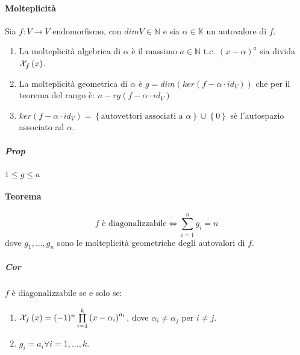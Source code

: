 \documentclass[a4paper,10pt]{article}
\begin{document}
\paragraph{Molteplicità} Sia $f: V \rightarrow V$ endomorfismo, con $dim V \in
\mathbb{N}$ e sia $\alpha \in \mathbb{K}$ un autovalore di $f$.
\begin{enumerate}
    \item La molteplicità algebrica di $\alpha$ è il massimo $a \in \mathbb{N}$
      t.c. $\left(x - \alpha\right)^a$ sia divida ${\cal X}_f\left(x\right)$.
    \item La molteplicità geometrica di $\alpha$ è $g =
      dim\left(ker\left(f - \alpha \cdot id_V\right)\right)$ che per il teorema
      del rango è: $n-rg\left(f - \alpha \cdot id_V\right)$
    \item $ker\left(f - \alpha\cdot id_V\right) =
      \left\{\text{autovettori associati a }\alpha\right\} \cup
      \left\{0\right\}$ sè l'autospazio associato ad $\alpha$.
\end{enumerate}
\subparagraph{Prop} $1 \leq g \leq a$

\paragraph{Teorema} \[f \text{ è diagonalizzabile} \Leftrightarrow
\sum_{i=1}^{n}g_i = n\]
dove $g_1, ..., g_n$ sono le molteplicità geometriche degli autovalori di $f$.

\subparagraph{Cor} $f$ è diagonalizzabile se e solo se:
\begin{enumerate}
    \item ${\cal X}_f\left(x\right) = (-1)^n \prod\limits_{i=1}^{k}
      \left(x-\alpha_i\right)^{a_i}$, dove $\alpha_i \neq \alpha_j$ per $i \neq
      j$.
    \item $g_i = a_i \forall i = 1, ..., k$.
\end{enumerate}
\end{document}
